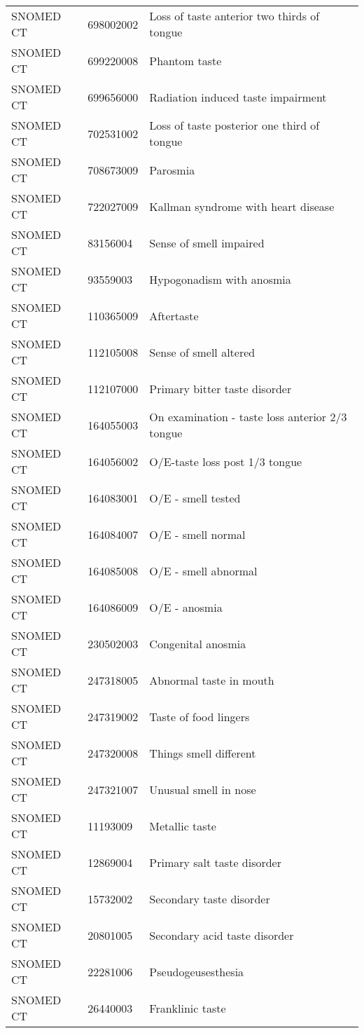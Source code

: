 \begin{longtable}{p{}p{}p{}}
  SNOMED CT & 698002002 & Loss of taste anterior two thirds of tongue \\ 
  SNOMED CT & 699220008 & Phantom taste \\ 
  SNOMED CT & 699656000 & Radiation induced taste impairment \\ 
  SNOMED CT & 702531002 & Loss of taste posterior one third of tongue \\ 
  SNOMED CT & 708673009 & Parosmia \\ 
  SNOMED CT & 722027009 & Kallman syndrome with heart disease \\ 
  SNOMED CT & 83156004 & Sense of smell impaired \\ 
  SNOMED CT & 93559003 & Hypogonadism with anosmia \\ 
  SNOMED CT & 110365009 & Aftertaste \\ 
  SNOMED CT & 112105008 & Sense of smell altered \\ 
  SNOMED CT & 112107000 & Primary bitter taste disorder \\ 
  SNOMED CT & 164055003 & On examination - taste loss anterior 2/3 tongue \\ 
  SNOMED CT & 164056002 & O/E-taste loss post 1/3 tongue \\ 
  SNOMED CT & 164083001 & O/E - smell tested \\ 
  SNOMED CT & 164084007 & O/E - smell normal \\ 
  SNOMED CT & 164085008 & O/E - smell abnormal \\ 
  SNOMED CT & 164086009 & O/E - anosmia \\ 
  SNOMED CT & 230502003 & Congenital anosmia \\ 
  SNOMED CT & 247318005 & Abnormal taste in mouth \\ 
  SNOMED CT & 247319002 & Taste of food lingers \\ 
  SNOMED CT & 247320008 & Things smell different \\ 
  SNOMED CT & 247321007 & Unusual smell in nose \\ 
  SNOMED CT & 11193009 & Metallic taste \\ 
  SNOMED CT & 12869004 & Primary salt taste disorder \\ 
  SNOMED CT & 15732002 & Secondary taste disorder \\ 
  SNOMED CT & 20801005 & Secondary acid taste disorder \\ 
  SNOMED CT & 22281006 & Pseudogeusesthesia \\ 
  SNOMED CT & 26440003 & Franklinic taste \\ 

\end{longtable}
